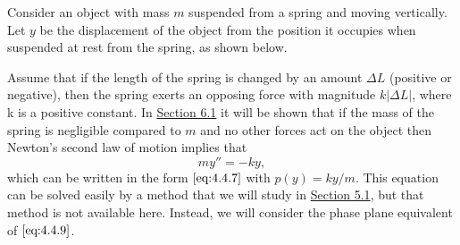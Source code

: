 \documentclass{ximera}
\begin{document}
 
 
\begin{example}\label{example:4.4.1}
 Consider an object with mass $m$ suspended from a
spring and moving vertically. Let $y$ be the displacement of the
object from the position it occupies when suspended at rest from the
spring, as shown below.

\begin{center}
\end{center}
 
 
Assume that if the length of the spring is changed by an amount
$\Delta L$ (positive or negative), then the spring exerts an opposing
force with magnitude $k|\Delta L|$, where k is a positive constant. In \href{https://xerxes.ximera.org/differentialequations/main/springProblemsI/springProblemsI}{Section 6.1} it will be shown that if the mass of the spring
is negligible compared to $m$ and no other forces act on the object then
Newton's second law of motion implies that
\begin{equation}\label{eq:4.4.9}
my''=-ky,
\end{equation}
which can be written in the form $\eqref{eq:4.4.7}$ with $p(y)=ky/m$. This
equation can be solved easily by a method that we will study in
\href{https://xerxes.ximera.org/differentialequations/main/homogeneousLinearEquations/homogeneousLinearEquations}{Section 5.1}, but that method is not available here. Instead,
we will consider the phase plane equivalent of $\eqref{eq:4.4.9}$.
 

\end{example}
\end{document}
